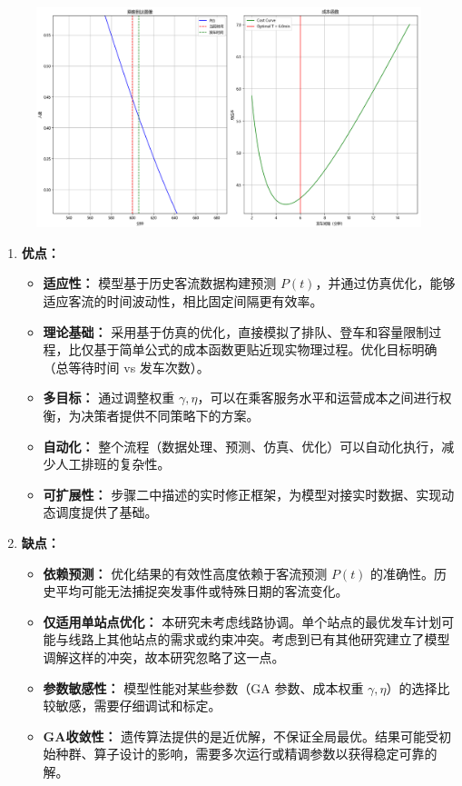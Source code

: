 \begin{figure}[htbp]
    \centering
    \includegraphics[width=1.0\textwidth]{res/Figure_8.png}
    \label{fig:gaBuji2}
\end{figure}


\begin{enumerate}
    \item \textbf{优点：}
        \begin{itemize}
            \item \textbf{适应性：} 模型基于历史客流数据构建预测 $P(t)$，并通过仿真优化，能够适应客流的时间波动性，相比固定间隔更有效率。
            \item \textbf{理论基础：} 采用基于仿真的优化，直接模拟了排队、登车和容量限制过程，比仅基于简单公式的成本函数更贴近现实物理过程。优化目标明确（总等待时间 vs 发车次数）。
            \item \textbf{多目标：} 通过调整权重 $\gamma, \eta$，可以在乘客服务水平和运营成本之间进行权衡，为决策者提供不同策略下的方案。
            \item \textbf{自动化：} 整个流程（数据处理、预测、仿真、优化）可以自动化执行，减少人工排班的复杂性。
            \item \textbf{可扩展性：} 步骤二中描述的实时修正框架，为模型对接实时数据、实现动态调度提供了基础。
        \end{itemize}
    \item \textbf{缺点：}
        \begin{itemize}
            \item \textbf{依赖预测：} 优化结果的有效性高度依赖于客流预测 $P(t)$ 的准确性。历史平均可能无法捕捉突发事件或特殊日期的客流变化。
            \item \textbf{仅适用单站点优化：} 本研究未考虑线路协调。单个站点的最优发车计划可能与线路上其他站点的需求或约束冲突。考虑到已有其他研究建立了模型调解这样的冲突，故本研究忽略了这一点。
            \item \textbf{参数敏感性：} 模型性能对某些参数（GA 参数、成本权重 $\gamma, \eta$）的选择比较敏感，需要仔细调试和标定。
            \item \textbf{GA收敛性：} 遗传算法提供的是近优解，不保证全局最优。结果可能受初始种群、算子设计的影响，需要多次运行或精调参数以获得稳定可靠的解。
        \end{itemize}
\end{enumerate}

